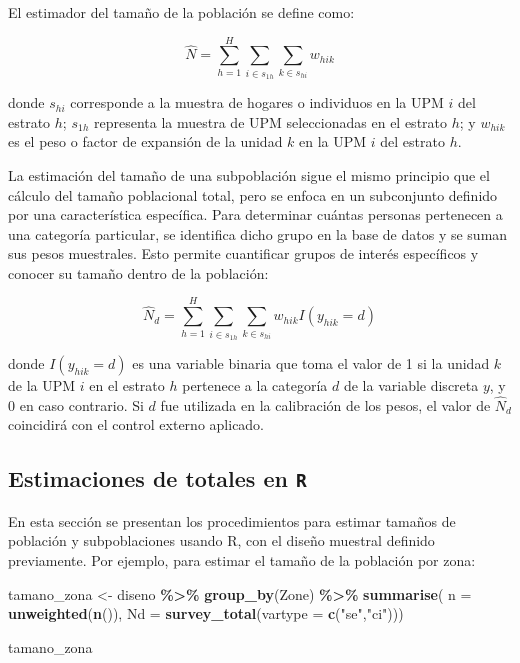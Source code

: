 \documentclass[
  12pt,
]{book}
\newenvironment{Shaded}{\begin{snugshade}}{\end{snugshade}}
\newcommand{\AttributeTok}[1]{\textcolor[rgb]{0.13,0.29,0.53}{#1}}
\newcommand{\FunctionTok}[1]{\textcolor[rgb]{0.13,0.29,0.53}{\textbf{#1}}}
\newcommand{\NormalTok}[1]{#1}
\newcommand{\OtherTok}[1]{\textcolor[rgb]{0.56,0.35,0.01}{#1}}
\newcommand{\SpecialCharTok}[1]{\textcolor[rgb]{0.81,0.36,0.00}{\textbf{#1}}}
\newcommand{\StringTok}[1]{\textcolor[rgb]{0.31,0.60,0.02}{#1}}
\begin{document}
El estimador del tamaño de la población se define como:

\[\hat{N} = \sum_{h=1}^{H} \sum_{i \in s_{1h}} \sum_{k \in s_{hi}} w_{hik}\]

donde \(s_{hi}\) corresponde a la muestra de hogares o individuos en la UPM \(i\) del estrato \(h\); \(s_{1h}\) representa la muestra de UPM seleccionadas en el estrato \(h\); y \(w_{hik}\) es el peso o factor de expansión de la unidad \(k\) en la UPM \(i\) del estrato \(h\).

La estimación del tamaño de una subpoblación sigue el mismo principio que el cálculo del tamaño poblacional total, pero se enfoca en un subconjunto definido por una característica específica. Para determinar cuántas personas pertenecen a una categoría particular, se identifica dicho grupo en la base de datos y se suman sus pesos muestrales. Esto permite cuantificar grupos de interés específicos y conocer su tamaño dentro de la población:

\[\hat{N}_d = \sum_{h=1}^{H} \sum_{i \in s_{1h}} \sum_{k \in s_{hi}} w_{hik} I(y_{hik}=d)\]

donde \(I(y_{hik}=d)\) es una variable binaria que toma el valor de 1 si la unidad \(k\) de la UPM \(i\) en el estrato \(h\) pertenece a la categoría \(d\) de la variable discreta \(y\), y 0 en caso contrario. Si \(d\) fue utilizada en la calibración de los pesos, el valor de \(\hat{N}_d\) coincidirá con el control externo aplicado.

\subsection*{\texorpdfstring{Estimaciones de totales en \texttt{R}}{Estimaciones de totales en R}}\label{estimaciones-de-totales-en-r}

En esta sección se presentan los procedimientos para estimar tamaños de población y subpoblaciones usando R, con el diseño muestral definido previamente. Por ejemplo, para estimar el tamaño de la población por zona:

\begin{Shaded}
\begin{Highlighting}[]
\NormalTok{tamano\_zona }\OtherTok{\textless{}{-}}\NormalTok{ diseno }\SpecialCharTok{\%\textgreater{}\%} \FunctionTok{group\_by}\NormalTok{(Zone) }\SpecialCharTok{\%\textgreater{}\%} 
               \FunctionTok{summarise}\NormalTok{( }\AttributeTok{n =} \FunctionTok{unweighted}\NormalTok{(}\FunctionTok{n}\NormalTok{()), }
                          \AttributeTok{Nd =} \FunctionTok{survey\_total}\NormalTok{(}\AttributeTok{vartype =} \FunctionTok{c}\NormalTok{(}\StringTok{"se"}\NormalTok{,}\StringTok{"ci"}\NormalTok{)))}

\NormalTok{tamano\_zona}
\end{Highlighting}
\end{Shaded}
\end{document}
